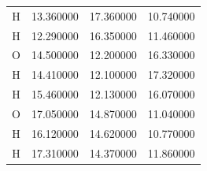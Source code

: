 \begin{table}
\begin{tabular}{ c c c c }
	H &  13.360000 &  17.360000 &  10.740000 \\
	H &  12.290000 &  16.350000 &  11.460000 \\
	O &  14.500000 &  12.200000 &  16.330000 \\
	H &  14.410000 &  12.100000 &  17.320000 \\
	H &  15.460000 &  12.130000 &  16.070000 \\
	O &  17.050000 &  14.870000 &  11.040000 \\
	H &  16.120000 &  14.620000 &  10.770000 \\
	H &  17.310000 &  14.370000 &  11.860000 \\
    \hline
    \hline
    \end{tabular}
\end{table}
